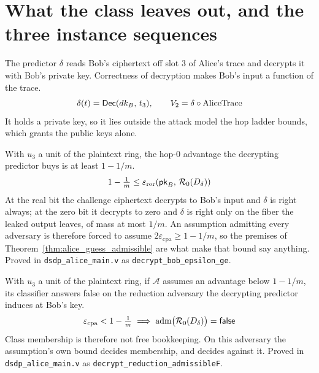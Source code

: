 \section{What the class leaves out, and the three instance sequences}

\begin{definition}
  \label{def:trace_decryptor}
  \rocqok
  The predictor $\delta$ reads Bob's ciphertext off slot $3$ of Alice's trace
  and decrypts it with Bob's private key. Correctness of decryption makes Bob's
  input a function of the trace.
  \[ \delta(t) = \mathsf{Dec}(dk_B,\, t_3),\qquad V_2 = \delta \circ \mathrm{AliceTrace} \]
  It holds a private key, so it lies outside the attack model the hop ladder
  bounds, which grants the public keys alone.
\end{definition}

\begin{theorem}
  \label{thm:decrypt_lower_bound}
  \rocqok
  With $u_3$ a unit of the plaintext ring, the hop-$0$ advantage the decrypting
  predictor buys is at least $1 - 1/m$.
  \[ 1 - \tfrac{1}{m} \le \varepsilon_{\mathrm{ror}}(\mathsf{pk}_B,\,\mathcal{R}_{0}(D_\delta)) \]
  At the real bit the challenge ciphertext decrypts to Bob's input and $\delta$
  is right always; at the zero bit it decrypts to zero and $\delta$ is right
  only on the fiber the leaked output leaves, of mass at most $1/m$. An
  assumption admitting every adversary is therefore forced to assume
  $2\varepsilon_{\mathrm{cpa}} \ge 1 - 1/m$, so the premises of
  Theorem~\ref{thm:alice_guess_admissible} are what make that bound say
  anything.
  Proved in \texttt{dsdp\_alice\_main.v} as
  \texttt{decrypt\_bob\_epsilon\_ge}.
\end{theorem}

\begin{corollary}
  \label{cor:decrypt_not_admissible}
  \rocqok
  With $u_3$ a unit of the plaintext ring, if $\mathcal{A}$ assumes an advantage
  below $1 - 1/m$, its classifier answers false on the reduction adversary the
  decrypting predictor induces at Bob's key.
  \[ \varepsilon_{\mathrm{cpa}} < 1 - \tfrac{1}{m} \implies
     \mathrm{adm}\big(\mathcal{R}_{0}(D_\delta)\big) = \mathsf{false} \]
  Class membership is therefore not free bookkeeping. On this adversary the
  assumption's own bound decides membership, and decides against it.
  Proved in \texttt{dsdp\_alice\_main.v} as
  \texttt{decrypt\_reduction\_admissibleF}.
\end{corollary}

